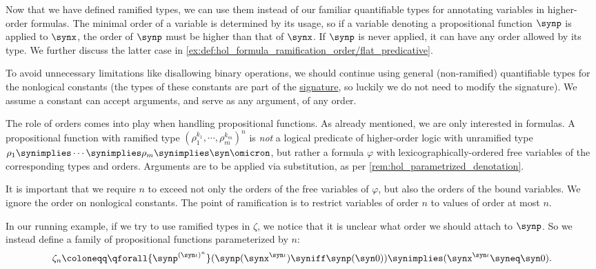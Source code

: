 \begin{definition}
\begin{thmenum}
     Now that we have defined ramified types, we can use them instead of our familiar quantifiable types for annotating variables in higher-order formulas. The minimal order of a variable is determined by its usage, so if a variable denoting a propositional function \( \synp \) is applied to \( \synx \), the order of \( \synp \) must be higher than that of \( \synx \). If \( \synp \) is never applied, it can have any order allowed by its type. We further discuss the latter case in \cref{ex:def:hol_formula_ramification_order/flat_predicative}.

    To avoid unnecessary limitations like disallowing binary operations, we should continue using general (non-ramified) quantifiable types for the nonlogical constants (the types of these constants are part of the \hyperref[def:hol_signature]{signature}, so luckily we do not need to modify the signature). We assume a constant can accept arguments, and serve as any argument, of any order.

    The role of orders comes into play when handling propositional functions. As already mentioned, we are only interested in formulas. A propositional function with ramified type \( (\rho_1^{k_1}, \cdots, \rho_m^{k_m})^n \) is \emph{not} a logical predicate of higher-order logic with unramified type \( \rho_1 \synimplies \cdots \synimplies \rho_m \synimplies \syn\omicron \), but rather a formula \( \varphi \) with lexicographically-ordered free variables of the corresponding types and orders. Arguments are to be applied via substitution, as per \cref{rem:hol_parametrized_denotation}.

    It is important that we require \( n \) to exceed not only the orders of the free variables of \( \varphi \), but also the orders of the bound variables. We ignore the order on nonlogical constants. The point of ramification is to restrict variables of order \( n \) to values of order at most \( n \).

    In our running example, if we try to use ramified types in \( \zeta \), we notice that it is unclear what order we should attach to \( \synp \). So we instead define a family of propositional functions parameterized by \( n \):
    \begin{equation*}
      \zeta_n \coloneqq \qforall {\synp^{(\syn\iota)^n}} (\synp(\synx^{\syn\iota}) \syniff \synp(\syn0)) \synimplies (\synx^{\syn\iota} \syneq \syn0).
    \end{equation*}


\end{thmenum}
\end{definition}

